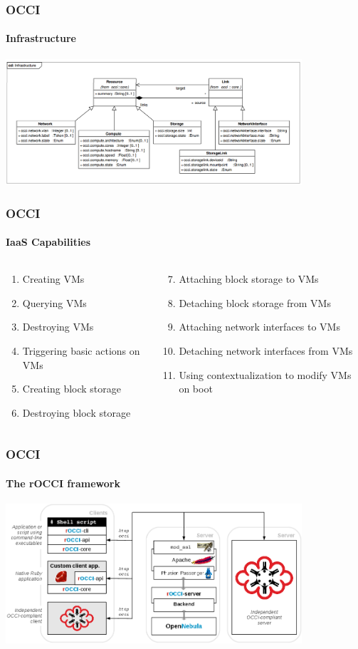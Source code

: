 \begin{frame}
  \frametitle{OCCI}
  \framesubtitle{Infrastructure}

  \includegraphics[width=11cm]{images/occi_infra_spec}
\end{frame}

\begin{frame}
  \frametitle{OCCI}
  \framesubtitle{IaaS Capabilities}

  \begin{columns}
  \begin{column}{0.5\textwidth}
    \begin{enumerate}
        \item Creating VMs
        \item Querying VMs
        \item Destroying VMs
        \item Triggering basic actions on VMs
        \item Creating block storage
        \item Destroying block storage
    \end{enumerate}
  \end{column}

  \begin{column}{0.5\textwidth}
    \begin{enumerate}
    \setcounter{enumi}{6}
        \item Attaching block storage to VMs
        \item Detaching block storage from VMs
        \item Attaching network interfaces to VMs
        \item Detaching network interfaces from VMs
        \item Using contextualization to modify VMs on boot
    \end{enumerate}
  \end{column}
  \end{columns}
\end{frame}

\begin{frame}
  \frametitle{OCCI}
  \framesubtitle{The rOCCI framework}

  \includegraphics[width=11cm]{images/OCCI_client_servers}
\end{frame}
